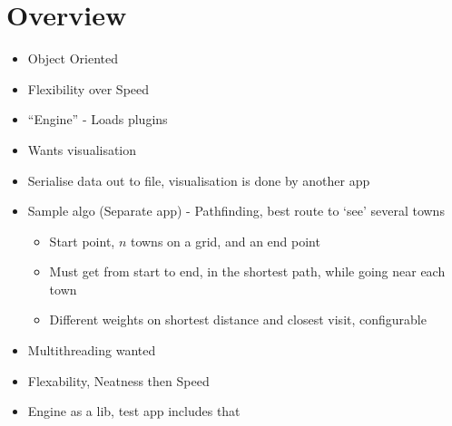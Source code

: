 
\date{8th August, 2011}
\apologies{}
\absent{-}


\maketitle

\section{Overview}
\begin{itemize}
 \item{Object Oriented}
 \item{Flexibility over Speed}
 \item{``Engine'' - Loads plugins}
 \item{Wants visualisation}
 \item{Serialise data out to file, visualisation is done by another app}
 \item{Sample algo (Separate app) - Pathfinding, best route to `see' several towns}
  \begin{itemize}
   \item{Start point, $n$ towns on a grid, and an end point}
   \item{Must get from start to end, in the shortest path, while going near each town}
   \item{Different weights on shortest distance and closest visit, configurable}
  \end{itemize}
 \item{Multithreading wanted}
 \item{Flexability, Neatness then Speed}
 \item{Engine as a lib, test app includes that}
\end{itemize}


